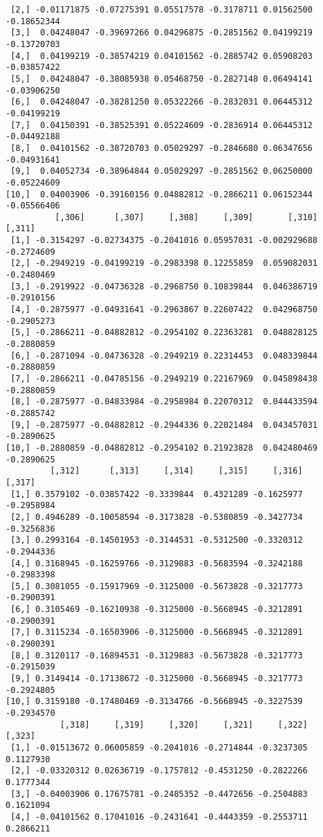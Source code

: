 \documentclass[
  letterpaper,
  DIV=11,
  numbers=noendperiod]{scrreprt}
\begin{document}
\begin{verbatim}
 [2,] -0.01171875 -0.07275391 0.05517578 -0.3178711 0.01562500 -0.18652344
 [3,]  0.04248047 -0.39697266 0.04296875 -0.2851562 0.04199219 -0.13720703
 [4,]  0.04199219 -0.38574219 0.04101562 -0.2885742 0.05908203 -0.03857422
 [5,]  0.04248047 -0.38085938 0.05468750 -0.2827148 0.06494141 -0.03906250
 [6,]  0.04248047 -0.38281250 0.05322266 -0.2832031 0.06445312 -0.04199219
 [7,]  0.04150391 -0.38525391 0.05224609 -0.2836914 0.06445312 -0.04492188
 [8,]  0.04101562 -0.38720703 0.05029297 -0.2846680 0.06347656 -0.04931641
 [9,]  0.04052734 -0.38964844 0.05029297 -0.2851562 0.06250000 -0.05224609
[10,]  0.04003906 -0.39160156 0.04882812 -0.2866211 0.06152344 -0.05566406
          [,306]      [,307]     [,308]     [,309]       [,310]     [,311]
 [1,] -0.3154297 -0.02734375 -0.2041016 0.05957031 -0.002929688 -0.2724609
 [2,] -0.2949219 -0.04199219 -0.2983398 0.12255859  0.059082031 -0.2480469
 [3,] -0.2919922 -0.04736328 -0.2968750 0.10839844  0.046386719 -0.2910156
 [4,] -0.2875977 -0.04931641 -0.2963867 0.22607422  0.042968750 -0.2905273
 [5,] -0.2866211 -0.04882812 -0.2954102 0.22363281  0.048828125 -0.2880859
 [6,] -0.2871094 -0.04736328 -0.2949219 0.22314453  0.048339844 -0.2880859
 [7,] -0.2866211 -0.04785156 -0.2949219 0.22167969  0.045898438 -0.2880859
 [8,] -0.2875977 -0.04833984 -0.2958984 0.22070312  0.044433594 -0.2885742
 [9,] -0.2875977 -0.04882812 -0.2944336 0.22021484  0.043457031 -0.2890625
[10,] -0.2880859 -0.04882812 -0.2954102 0.21923828  0.042480469 -0.2890625
         [,312]      [,313]     [,314]     [,315]     [,316]     [,317]
 [1,] 0.3579102 -0.03857422 -0.3339844  0.4321289 -0.1625977 -0.2958984
 [2,] 0.4946289 -0.10058594 -0.3173828 -0.5380859 -0.3427734 -0.3256836
 [3,] 0.2993164 -0.14501953 -0.3144531 -0.5312500 -0.3320312 -0.2944336
 [4,] 0.3168945 -0.16259766 -0.3129883 -0.5683594 -0.3242188 -0.2983398
 [5,] 0.3081055 -0.15917969 -0.3125000 -0.5673828 -0.3217773 -0.2900391
 [6,] 0.3105469 -0.16210938 -0.3125000 -0.5668945 -0.3212891 -0.2900391
 [7,] 0.3115234 -0.16503906 -0.3125000 -0.5668945 -0.3212891 -0.2900391
 [8,] 0.3120117 -0.16894531 -0.3129883 -0.5673828 -0.3217773 -0.2915039
 [9,] 0.3149414 -0.17138672 -0.3125000 -0.5668945 -0.3217773 -0.2924805
[10,] 0.3159180 -0.17480469 -0.3134766 -0.5668945 -0.3227539 -0.2934570
           [,318]     [,319]     [,320]     [,321]     [,322]    [,323]
 [1,] -0.01513672 0.06005859 -0.2041016 -0.2714844 -0.3237305 0.1127930
 [2,] -0.03320312 0.02636719 -0.1757812 -0.4531250 -0.2822266 0.1777344
 [3,] -0.04003906 0.17675781 -0.2485352 -0.4472656 -0.2504883 0.1621094
 [4,] -0.04101562 0.17041016 -0.2431641 -0.4443359 -0.2553711 0.2866211

\end{verbatim}
\end{document}
